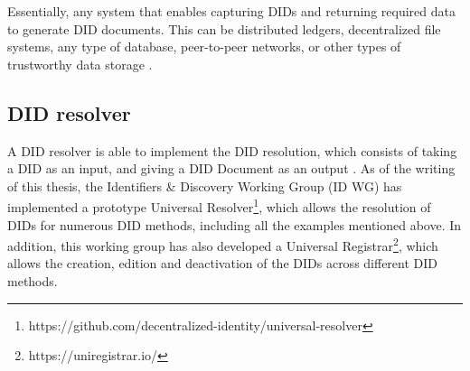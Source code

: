 Essentially, any system that enables capturing DIDs and returning required data to generate DID documents. This can be distributed ledgers, decentralized file systems, any type of database, peer-to-peer networks, or other types of trustworthy data storage \cite{sporny_longley_sabadello_reed_steele_2021}.

\subsection{DID resolver}

A DID resolver is able to implement the DID resolution, which consists of taking a DID as an input, and giving a DID Document as an output \cite{sporny_longley_sabadello_reed_steele_2021}. As of the writing of this thesis, the Identifiers \& Discovery Working Group (ID WG) has implemented a prototype Universal Resolver\footnote{https://github.com/decentralized-identity/universal-resolver}, which allows the resolution of DIDs for numerous DID methods, including all the examples mentioned above. In addition, this working group has also developed a Universal Registrar\footnote{https://uniregistrar.io/}, which allows the creation, edition and deactivation of the DIDs across different DID methods.



















